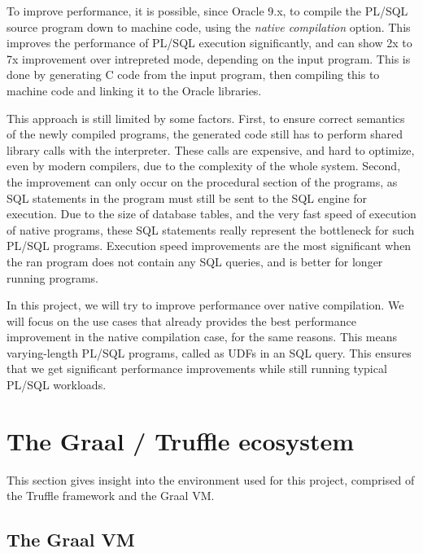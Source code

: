 \documentclass[twoside,11pt,a4paper]{article}
\newcommand{\startsection}[1]{
	\cleardoublepage
	\section{#1}
	\thispagestyle{basic}
}
\begin{document}
To improve performance, it is possible, since Oracle 9.x, to compile the PL/SQL source program down to machine code, using the \textit{native compilation} option. This improves the performance of PL/SQL execution significantly, and can show 2x to 7x improvement over intrepreted mode, depending on the input program. This is done by generating C code from the input program, then compiling this to machine code and linking it to the Oracle libraries.

This approach is still limited by some factors. First, to ensure correct semantics of the newly compiled programs, the generated code still has to perform shared library calls with the interpreter. These calls are expensive, and hard to optimize, even by modern compilers, due to the complexity of the whole system. Second, the improvement can only occur on the procedural section of the programs, as SQL statements in the program must still be sent to the SQL engine for execution. Due to the size of database tables, and the very fast speed of execution of native programs, these SQL statements really represent the bottleneck for such PL/SQL programs. Execution speed improvements are the most significant when the ran program does not contain any SQL queries, and is better for longer running programs.

In this project, we will try to improve performance over native compilation. We will focus on the use cases that already provides the best performance improvement in the native compilation case, for the same reasons. This means varying-length PL/SQL programs, called as UDFs in an SQL query. This ensures that we get significant performance improvements while still running typical PL/SQL workloads.

\startsection{The Graal / Truffle ecosystem}

This section gives insight into the environment used for this project, comprised of the Truffle framework and the Graal VM.

\subsection{The Graal VM}

\end{document}
